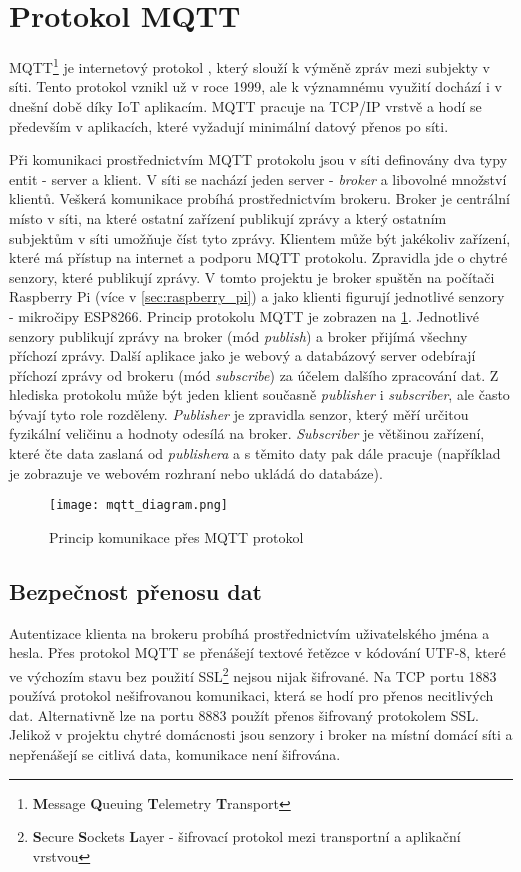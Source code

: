 \section{Protokol MQTT} \label{sec:protocol_mqtt}
MQTT\footnote{\textbf{M}essage \textbf{Q}ueuing \textbf{T}elemetry \textbf{T}ransport} je internetový protokol \cite{IoT-MQTT-prakticky:online}, který slouží k výměně zpráv mezi subjekty v síti. Tento protokol vznikl už v roce 1999, ale k významnému využití dochází i v dnešní době díky IoT aplikacím. MQTT pracuje na TCP/IP vrstvě a hodí se především v aplikacích, které vyžadují minimální datový přenos po síti.  \par
Při komunikaci prostřednictvím MQTT protokolu jsou v síti definovány dva typy entit - server a klient. V síti se nachází jeden server - \textit{broker} a libovolné množství klientů. Veškerá komunikace probíhá prostřednictvím brokeru. Broker je centrální místo v síti, na které ostatní zařízení publikují zprávy a který ostatním subjektům v síti umožňuje číst tyto zprávy. Klientem může být jakékoliv zařízení, které má přístup na internet a podporu MQTT protokolu. Zpravidla jde o chytré senzory, které publikují zprávy. V tomto projektu je broker spuštěn na počítači Raspberry Pi (více v \cref{sec:raspberry_pi}) a jako klienti figurují jednotlivé senzory - mikročipy ESP8266. Princip protokolu MQTT je zobrazen na \cref{fig:mqtt_communication}. Jednotlivé senzory publikují zprávy na broker (mód \textit{publish}) a broker přijímá všechny příchozí zprávy. Další aplikace jako je webový a databázový server odebírají příchozí zprávy od brokeru (mód \textit{subscribe}) za účelem dalšího zpracování dat. Z hlediska protokolu může být jeden klient současně \textit{publisher} i \textit{subscriber}, ale často bývají tyto role rozděleny. \textit{Publisher} je zpravidla senzor, který měří určitou fyzikální veličinu a hodnoty odesílá na broker. \textit{Subscriber} je většinou zařízení, které čte data zaslaná od \textit{publishera} a s těmito daty pak dále pracuje (například je zobrazuje ve webovém rozhraní nebo ukládá do databáze). 

\begin{figure}[H]
  \centering
  \texttt{[image: mqtt\_diagram.png]}
  \caption{Princip komunikace přes MQTT protokol}
  \label{fig:mqtt_communication}
\end{figure}

\subsection*{Bezpečnost přenosu dat}
Autentizace klienta na brokeru probíhá prostřednictvím uživatelského jména a hesla. Přes protokol MQTT se přenášejí textové řetězce v kódování UTF-8, které ve výchozím stavu bez použití SSL\footnote{\textbf{S}ecure \textbf{S}ockets \textbf{L}ayer - šifrovací protokol mezi transportní a aplikační vrstvou} nejsou nijak šifrované. Na TCP portu 1883 používá protokol nešifrovanou komunikaci, která se hodí pro přenos necitlivých dat. Alternativně lze na portu 8883 použít přenos šifrovaný protokolem SSL. Jelikož v projektu chytré domácnosti jsou senzory i broker na místní domácí síti a nepřenášejí se citlivá data, komunikace není šifrována.

